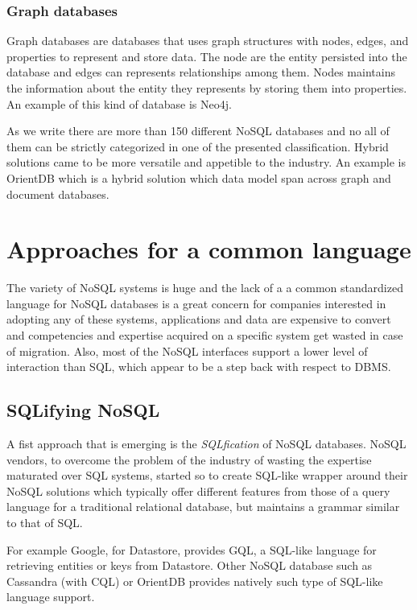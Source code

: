 \subsubsection{Graph databases} 
Graph databases are databases that uses graph structures with nodes, edges, and properties to represent and store data.
The node are the entity persisted into the database and edges can represents relationships among them. Nodes maintains the information about the entity they represents by storing them into properties.
An example of this kind of database is Neo4j.

\noindent As we write there are more than 150 \cite{online:nosql-database.org} different NoSQL databases and no all of them can be strictly categorized in one of the presented classification. Hybrid solutions came to be more versatile and appetible to the industry. An example is OrientDB which is a hybrid solution which data model span across graph and document databases. 

\section{Approaches for a common language}
\label{sec:common-language}
The variety of NoSQL systems is huge and the lack of a a common standardized language for NoSQL databases is a great concern for companies interested in adopting any of these systems, applications and data are expensive to convert and competencies and expertise acquired on a specific system get wasted in case of migration. 
Also, most of the NoSQL interfaces support a lower level of interaction than SQL, which appear to be a step back with respect to DBMS.

\subsection{SQLifying NoSQL}
A fist approach that is emerging is the \textit{SQLfication} of NoSQL databases.
NoSQL vendors, to overcome the problem of the industry of wasting the expertise maturated over SQL systems, started so to create SQL-like wrapper around their NoSQL solutions which typically offer different features from those of a query language for a traditional relational database, but maintains a grammar similar to that of SQL.

\noindent For example Google, for Datastore, provides GQL, a SQL-like language for retrieving entities or keys from Datastore.
Other NoSQL database such as Cassandra (with CQL) or OrientDB provides natively such type of SQL-like language support.

